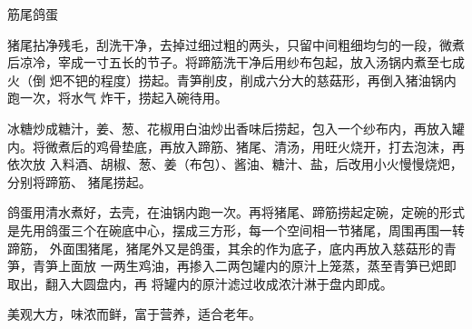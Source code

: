 \begin{recipe}[筋鞭鸽蛋]{筋尾鸽蛋}

\ingredients


\preparation

\step 猪尾拈净残毛，刮洗干净，去掉过细过粗的两头，只留中间粗细均匀的一段，微煮
后凉冷，宰成一寸五长的节子。将蹄筋洗干净后用纱布包起，放入汤锅内煮至七成火（倒
𤆵不钯的程度）捞起。青笋削皮，削成六分大的慈菇形，再倒入猪油锅内跑一次，将水气
炸干，捞起入碗待用。

\step 冰糖炒成糖汁，姜、葱、花椒用白油炒出香味后捞起，包入一个纱布内，再放入罐
内。将微煮后的鸡骨垫底，再放入蹄筋、猪尾、清汤，用旺火烧开，打去泡沫，再依次放
入料酒、胡椒、葱、姜（布包）、酱油、糖汁、盐，后改用小火慢慢烧𤆵，分别将蹄筋、
猪尾捞起。

\step 鸽蛋用清水煮好，去壳，在油锅内跑一次。再将猪尾、蹄筋捞起定碗，定碗的形式
是先用鸽蛋三个在碗底中心，摆成三方形，每一个空间相一节猪尾，周围再围一转蹄筋，
外面围猪尾，猪尾外又是鸽蛋，其余的作为底子，底内再放入慈菇形的青笋，青笋上面放
一两生鸡油，再掺入二两包罐内的原汁上笼蒸，蒸至青笋已𤆵即取出，翻入大圆盘内，再
将罐内的原汁滤过收成浓汁淋于盘内即成。

\features

美观大方，味浓而鲜，富于营养，适合老年。

\end{recipe}

